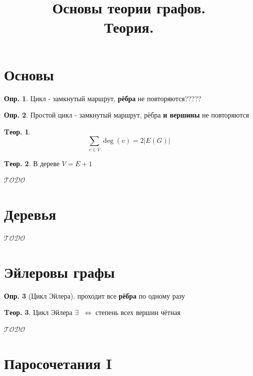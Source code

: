 \documentclass[a4paper,12pt]{article}
\title{Основы теории графов.\\Теория.}
\author{}
\date{}
\theoremstyle{definition}
\newtheorem{definition}{Опр.}[section]
\theoremstyle{definition}
\newtheorem{theorem}{Tеор.}[section]
\def\iiff{$\;\Longleftrightarrow\;$}
\def\iiTODO{\guillemotleft$\mathcal{TODO}$\guillemotright\textellipsis}
\begin{document}
\maketitle



\section{Основы}

\begin{definition}
	Цикл - замкнутый маршрут, \textbf{рёбра} не повторяются?????
\end{definition}

\begin{definition}
	Простой цикл - замкнутый маршрут, рёбра \textbf{и вершины} не повторяются
\end{definition}

\begin{theorem}
	\[ \sum_{v \in V} \deg(v) = 2 |E(G)|  \]
\end{theorem}

\begin{theorem}
	В дереве $V = E+1$
\end{theorem}

\iiTODO



\section{Деревья}

\iiTODO



\section{Эйлеровы графы}

\begin{definition}[Цикл Эйлера] проходит все \textbf{рёбра} по одному разу \end{definition}

\begin{theorem}
	Цикл Эйлера $\exists$ \iiff степень всех вершин чётная
\end{theorem}

\iiTODO



\section{Паросочетания I}
\end{document}
